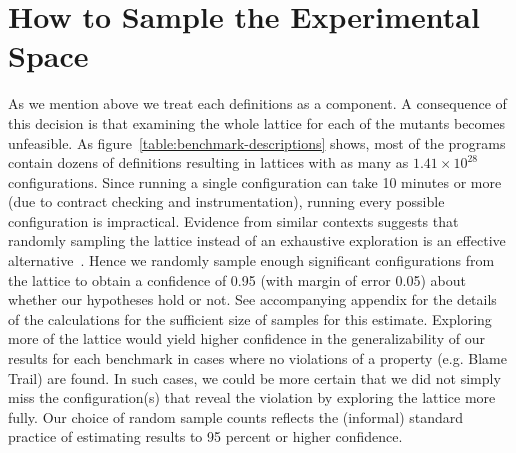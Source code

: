\section{How to Sample the Experimental Space} \label{sec:sample}

As we mention above we treat each definitions as a component. A
consequence of this decision is that examining the whole lattice
for each of the mutants becomes unfeasible.
As figure~\ref{table:benchmark-descriptions} shows,  most of the programs contain dozens of definitions  
resulting in lattices with as many as $1.41 \times 10^{28}$ configurations.
Since running a single configuration can take 10 minutes or more 
(due to contract checking and instrumentation), running every possible configuration is impractical.
Evidence from similar contexts suggests that randomly sampling the lattice instead of
an exhaustive exploration is an effective alternative~\cite{gtnffvf-jfp-2019}.
Hence we randomly sample enough significant configurations
from the lattice to obtain a confidence of 0.95 (with margin of error
0.05) about whether our hypotheses hold or not.
See accompanying appendix for the details of the calculations for the
sufficient size of samples for this estimate.
Exploring more of the lattice would yield higher confidence in the generalizability
of our results for each benchmark in cases where no violations of a property
(e.g. Blame Trail) are found.
In such cases, we could be more certain that we did not simply miss
the configuration(s) that reveal the violation by exploring the lattice more fully.
Our choice of random sample counts reflects the (informal) standard practice of estimating
results to 95 percent or higher confidence.
